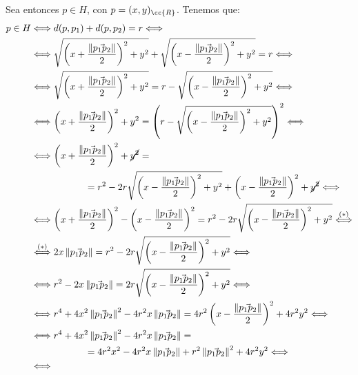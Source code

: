 \begin{ejercicio}
\begin{enumerate}
    Sea entonces $p\in H$, con $p=(x,y)_{\cc{R}}$. Tenemos que:
    \begin{align*}
        p\in H &\Longleftrightarrow
        d(p,p_1) + d(p,p_2) = r \Longleftrightarrow \\ & \Longleftrightarrow
        \sqrt{\left(x+\frac{\left\|\vec{p_1p_2}\right\|}{2}\right)^2 + y^2} + \sqrt{\left(x-\frac{\left\|\vec{p_1p_2}\right\|}{2}\right)^2 + y^2} = r \Longleftrightarrow \\ & \Longleftrightarrow
        \sqrt{\left(x+\frac{\left\|\vec{p_1p_2}\right\|}{2}\right)^2 + y^2} = r - \sqrt{\left(x-\frac{\left\|\vec{p_1p_2}\right\|}{2}\right)^2 + y^2} \Longleftrightarrow \\ & \Longleftrightarrow
        \left(x+\frac{\left\|\vec{p_1p_2}\right\|}{2}\right)^2 + y^2 = \left(r - \sqrt{\left(x-\frac{\left\|\vec{p_1p_2}\right\|}{2}\right)^2 + y^2}\right)^2 \Longleftrightarrow \\ & \Longleftrightarrow
        \left(x+\frac{\left\|\vec{p_1p_2}\right\|}{2}\right)^2 + \cancel{y^2} =\\&\hspace{2cm}=r^2 - 2r\sqrt{\left(x-\frac{\left\|\vec{p_1p_2}\right\|}{2}\right)^2 + y^2} + \left(x-\frac{\left\|\vec{p_1p_2}\right\|}{2}\right)^2 + \cancel{y^2} \Longleftrightarrow \\ & \Longleftrightarrow
        \left(x+\frac{\left\|\vec{p_1p_2}\right\|}{2}\right)^2 - \left(x-\frac{\left\|\vec{p_1p_2}\right\|}{2}\right)^2 =r^2 - 2r\sqrt{\left(x-\frac{\left\|\vec{p_1p_2}\right\|}{2}\right)^2 + y^2} \stackrel{(\ast)}{\Longleftrightarrow} \\ & \stackrel{(\ast)}{\Longleftrightarrow}
        2x\left\|\vec{p_1p_2}\right\| = r^2 - 2r\sqrt{\left(x-\frac{\left\|\vec{p_1p_2}\right\|}{2}\right)^2 + y^2} \Longleftrightarrow \\ & \Longleftrightarrow
        r^2 - 2x\left\|\vec{p_1p_2}\right\| = 2r\sqrt{\left(x-\frac{\left\|\vec{p_1p_2}\right\|}{2}\right)^2 + y^2} \Longleftrightarrow \\ & \Longleftrightarrow
        r^4 + 4x^2\left\|\vec{p_1p_2}\right\|^2 - 4r^2x\left\|\vec{p_1p_2}\right\| = 4r^2\left(x-\frac{\left\|\vec{p_1p_2}\right\|}{2}\right)^2 + 4r^2y^2 \Longleftrightarrow \\ & \Longleftrightarrow
        r^4 + 4x^2\left\|\vec{p_1p_2}\right\|^2 - 4r^2x\left\|\vec{p_1p_2}\right\| =\\&\hspace{2cm}=4r^2x^2 - 4r^2x\left\|\vec{p_1p_2}\right\| +r^2\left\|\vec{p_1p_2}\right\|^2 + 4r^2y^2 \Longleftrightarrow \\ & \Longleftrightarrow

\end{align*}
\end{enumerate}
\end{ejercicio}
